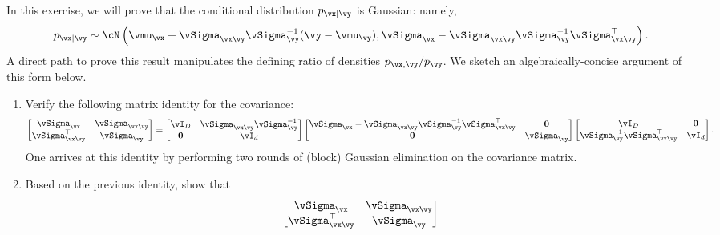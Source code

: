 \documentclass[../../book-main.tex]{subfiles}
\begin{document}
\begin{exercise}
  In this exercise, we will prove that the conditional distribution $p_{\vx \mid
  \vy}$ is Gaussian: namely,
  \begin{equation}\label{eq:gaussian-conditional-eqn}
    p_{\vx \mid \vy} \sim \cN\left(
      \vmu_{\vx} + \vSigma_{\vx\vy} \vSigma_{\vy}^{-1} (\vy - \vmu_{\vy}),
      \vSigma_{\vx} - \vSigma_{\vx\vy} \vSigma_{\vy}^{-1}
      \vSigma_{\vx\vy}^{\top}
    \right).
  \end{equation}
  A direct path to prove this result manipulates the defining ratio of
  densities $p_{\vx, \vy} / p_{\vy}$. We sketch an algebraically-concise
  argument of this form below.

  \begin{enumerate}
    \item Verify the following matrix identity for the covariance:
      \begin{equation}\label{eq:gaussian-conditional-covariance-block}
        \begin{bmatrix}
          \vSigma_{\vx} & \vSigma_{\vx\vy} \\
          \vSigma_{\vx\vy}^\top & \vSigma_{\vy}
        \end{bmatrix}
        =
        \begin{bmatrix}
          \vI_D & \vSigma_{\vx\vy}\vSigma_{\vy}^{-1} \\
          \Zero & \vI_d
        \end{bmatrix}
        \begin{bmatrix}
          \vSigma_{\vx} - \vSigma_{\vx\vy} \vSigma_{\vy}^{-1}
          \vSigma_{\vx\vy}^{\top} & \Zero \\
          \Zero & \vSigma_{\vy}
        \end{bmatrix}
        \begin{bmatrix}
          \vI_D & \Zero\\
          \vSigma_{\vy}^{-1}\vSigma_{\vx\vy}^\top & \vI_d
        \end{bmatrix}.
      \end{equation}
      One arrives at this identity by performing two rounds of (block) Gaussian
      elimination on the covariance matrix.
    \item Based on the previous identity, show that
      \begin{equation}\label{eq:gaussian-conditional-covariance-inverse-block}
        \begin{bmatrix}
          \vSigma_{\vx} & \vSigma_{\vx\vy} \\
          \vSigma_{\vx\vy}^\top & \vSigma_{\vy}

\end{bmatrix}
\end{equation}
\end{enumerate}
\end{exercise}
\end{document}
